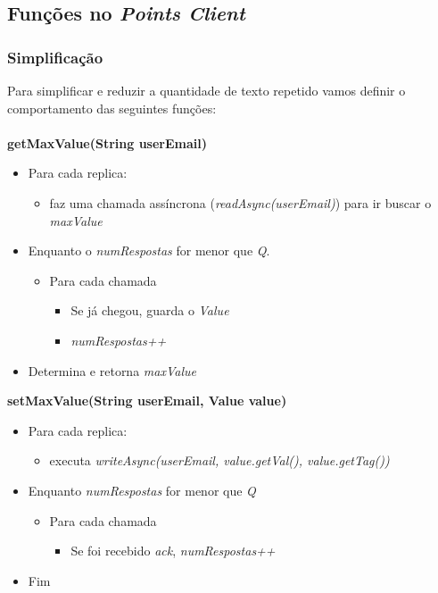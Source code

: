 \documentclass[a4paper]{article}
\begin{document}
\subsection{Funções no \textit{Points Client}}
\subsubsection{Simplificação}
Para simplificar e reduzir a quantidade de texto repetido vamos definir o comportamento das seguintes funções:\\
\\
\textbf{getMaxValue(String userEmail)}
\begin{itemize}
\item Para cada replica:
\begin{itemize}
\item faz uma chamada assíncrona (\textit{readAsync(userEmail)}) para ir buscar o \textit{maxValue}
\end{itemize}
\item Enquanto o \textit{numRespostas} for menor que \textit{Q}.
\begin{itemize}
\item Para cada chamada
\begin{itemize}
\item Se já chegou, guarda o \textit{Value}
\item \textit{numRespostas++}
\end{itemize}
\end{itemize}
\item Determina e retorna \textit{maxValue}
\end{itemize}
\textbf{setMaxValue(String userEmail, Value value)}
\begin{itemize}
\item Para cada replica:
\begin{itemize}
\item executa \textit{writeAsync(userEmail, value.getVal(), value.getTag())}
\end{itemize}
\item Enquanto \textit{numRespostas} for menor que \textit{Q}
\begin{itemize}
\item Para cada chamada
\begin{itemize}
\item Se foi recebido \textit{ack}, \textit{numRespostas++}
\end{itemize}
\end{itemize}
\item Fim
\end{itemize}
\end{document}
